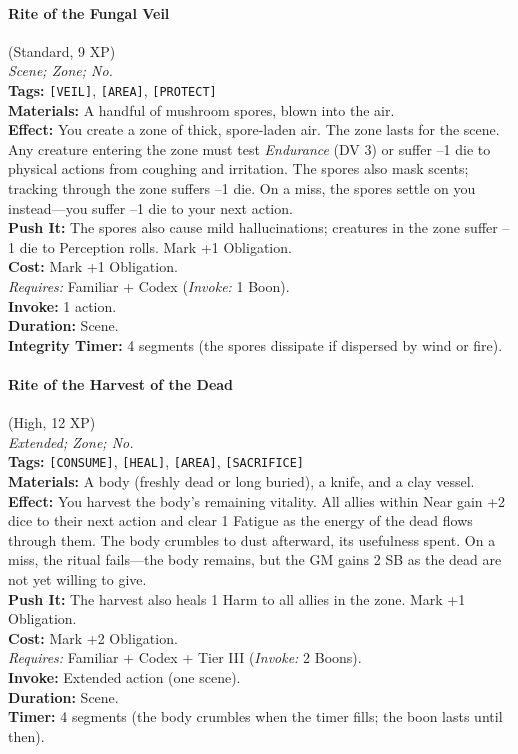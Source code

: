 \paragraph{Rite of the Fungal Veil} (Standard, 9 XP) \hfill \\
\emph{Scene; Zone; No.} \\
\textbf{Tags:} \texttt{[VEIL]}, \texttt{[AREA]}, \texttt{[PROTECT]} \\
\textbf{Materials:} A handful of mushroom spores, blown into the air. \\
\textbf{Effect:} You create a zone of thick, spore-laden air. The zone lasts for the scene. Any creature entering the zone must test \textit{Endurance} (DV 3) or suffer --1 die to physical actions from coughing and irritation. The spores also mask scents; tracking through the zone suffers --1 die. On a miss, the spores settle on you instead---you suffer --1 die to your next action. \\
\textbf{Push It:} The spores also cause mild hallucinations; creatures in the zone suffer --1 die to Perception rolls. Mark +1 Obligation. \\
\textbf{Cost:} Mark +1 Obligation. \\
\textit{Requires:} Familiar + Codex (\textit{Invoke:} 1 Boon). \\
\textbf{Invoke:} 1 action. \\
\textbf{Duration:} Scene. \\
\textbf{Integrity Timer:} 4 segments (the spores dissipate if dispersed by wind or fire).

\paragraph{Rite of the Harvest of the Dead} (High, 12 XP) \hfill \\
\emph{Extended; Zone; No.} \\
\textbf{Tags:} \texttt{[CONSUME]}, \texttt{[HEAL]}, \texttt{[AREA]}, \texttt{[SACRIFICE]} \\
\textbf{Materials:} A body (freshly dead or long buried), a knife, and a clay vessel. \\
\textbf{Effect:} You harvest the body's remaining vitality. All allies within Near gain +2 dice to their next action and clear 1 Fatigue as the energy of the dead flows through them. The body crumbles to dust afterward, its usefulness spent. On a miss, the ritual fails---the body remains, but the GM gains 2 SB as the dead are not yet willing to give. \\
\textbf{Push It:} The harvest also heals 1 Harm to all allies in the zone. Mark +1 Obligation. \\
\textbf{Cost:} Mark +2 Obligation. \\
\textit{Requires:} Familiar + Codex + Tier III (\textit{Invoke:} 2 Boons). \\
\textbf{Invoke:} Extended action (one scene). \\
\textbf{Duration:} Scene. \\
\textbf{Timer:} 4 segments (the body crumbles when the timer fills; the boon lasts until then).

